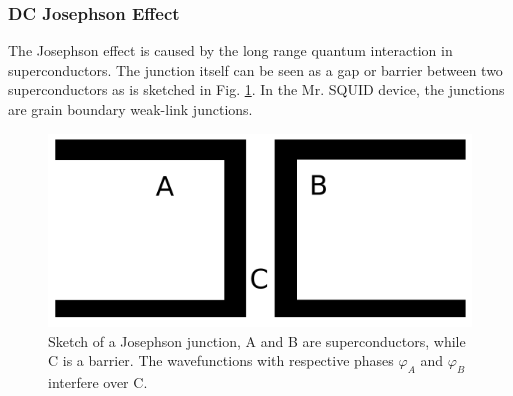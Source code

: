 \documentclass[a4paper,10pt]{article}
\begin{document}
\subsubsection*{DC Josephson Effect}
The Josephson effect is caused by the long range quantum interaction in superconductors. The junction itself can be seen as a gap or barrier between two superconductors as is sketched in Fig. \ref{figure_josephson_junction}. In the Mr. SQUID \cite{skriptum} device, the junctions are grain boundary weak-link junctions. 

\begin{figure}[htp!]
    \centering
    \includegraphics[width = 0.4 \textwidth]{josephson.png}
    \caption{Sketch of a Josephson junction, A and B are superconductors, while C is a barrier. The wavefunctions with respective phases $\varphi_A$ and $\varphi_B$ interfere over  C.}
    \label{figure_josephson_junction}
\end{figure}
\end{document}
